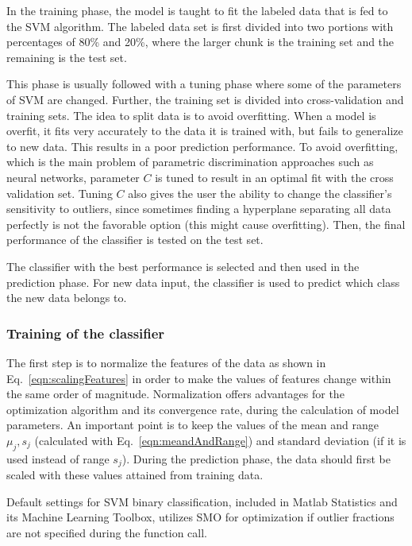 In the training phase, the model is taught to fit the labeled data that is fed to the SVM algorithm. The labeled data set is first divided into two portions with percentages of 80\% and 20\%, where the larger chunk is the training set and the remaining is the test set. 

This phase is usually followed with a tuning phase where some of the parameters of SVM are changed. Further, the training set is divided into cross-validation and training sets. The idea to split data is to avoid overfitting. When a model is overfit, it fits very accurately to the data it is trained with, but fails to generalize to new data. This results in a poor prediction performance. To avoid overfitting, which is the main problem of parametric discrimination approaches such as neural networks, parameter $C$ is tuned to result in an optimal fit with the cross validation set. Tuning $C$ also gives the user the ability to change the classifier's sensitivity to outliers, since sometimes finding a hyperplane separating all data perfectly is not the favorable option (this might cause overfitting). Then, the final performance of the classifier is tested on the test set. 

The classifier with the best performance is selected and then used in the prediction phase.  
For new data input, the classifier is used to predict which class the new data belongs to.



\subsubsection{Training of the classifier}

The first step is to normalize the features of the data as shown in Eq.~\ref{eqn:scalingFeatures} in order to make the values of features change within the same order of magnitude. 
Normalization offers advantages for the optimization algorithm and its convergence rate, during the calculation of model parameters.  
An important point is to keep the values of the mean and range $\mu_j, s_j$ (calculated with Eq.~\ref{eqn:meandAndRange}) and standard deviation (if it is used instead of range $s_j$). 
During the prediction phase, the data should first be scaled with these values attained from training data.

Default settings for SVM binary classification, included in Matlab Statistics and its Machine Learning Toolbox, utilizes SMO for optimization if outlier fractions are not specified during the function call. 

